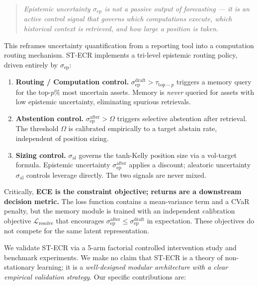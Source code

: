 \documentclass[11pt,a4paper]{article}
\newcommand{\sep}{\sigma_{\mathrm{ep}}}
\newcommand{\sal}{\sigma_{\mathrm{al}}}
\newcommand{\sepd}{\sigma_{\mathrm{ep}}^{\mathrm{draft}}}
\newcommand{\sepa}{\sigma_{\mathrm{ep}}^{\mathrm{after}}}
\newcommand{\Lres}{\mathcal{L}_{\mathrm{resolve}}}
\begin{document}
\begin{quote}
\emph{Epistemic uncertainty $\sep$ is not a passive output of forecasting ---
it is an active control signal that governs which computations execute,
which historical context is retrieved, and how large a position is taken.}
\end{quote}

This reframes uncertainty quantification from a reporting tool into a
computation routing mechanism.  ST-ECR implements a tri-level epistemic
routing policy, driven entirely by $\sep$:

\begin{enumerate}
\item \textbf{Routing / Computation control.}  $\sepd > \tau_{\mathrm{top-}p}$
triggers a memory query for the top-$p\%$ most uncertain assets.  Memory is
\emph{never} queried for assets with low epistemic uncertainty, eliminating
spurious retrievals.

\item \textbf{Abstention control.}  $\sepa > \Omega$ triggers selective
abstention after retrieval.  The threshold $\Omega$ is calibrated empirically
to a target abstain rate, independent of position sizing.

\item \textbf{Sizing control.}  $\sal$ governs the tanh-Kelly position size via
a vol-target formula.  Epistemic uncertainty $\sepa$ applies a discount;
aleatoric uncertainty $\sal$ controls leverage directly.  The two signals are
never mixed.
\end{enumerate}

Critically, \textbf{ECE is the constraint objective; returns are a downstream
decision metric.}  The loss function contains a mean-variance term and a CVaR
penalty, but the memory module is trained with an independent calibration
objective $\Lres$ that encourages $\sepa \le \sepd$ in expectation.  These
objectives do not compete for the same latent representation.

We validate ST-ECR via a 5-arm factorial controlled intervention study and
benchmark experiments.  We make no claim that ST-ECR is a theory of
non-stationary learning; it is a \emph{well-designed modular architecture
with a clear empirical validation strategy}.  Our specific contributions are:
\end{document}
